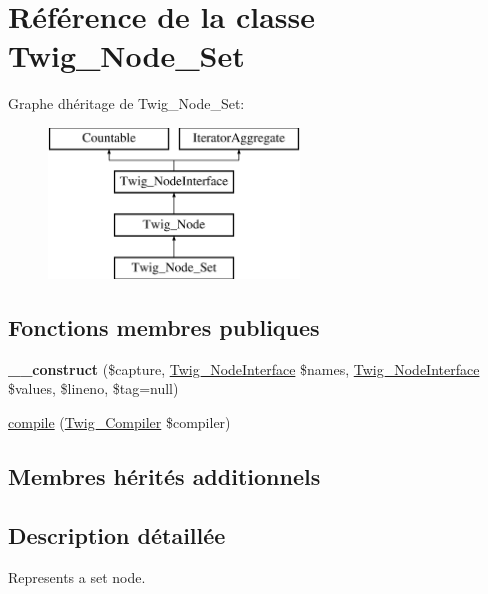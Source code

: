 \hypertarget{class_twig___node___set}{}\section{Référence de la classe Twig\+\_\+\+Node\+\_\+\+Set}
\label{class_twig___node___set}
Graphe d\textquotesingle{}héritage de Twig\+\_\+\+Node\+\_\+\+Set\+:\begin{figure}[H]
\begin{center}
\leavevmode
\includegraphics[height=4.000000cm]{class_twig___node___set}
\end{center}
\end{figure}
\subsection*{Fonctions membres publiques}
\begin{DoxyCompactItemize}
\item 
{\bfseries \+\_\+\+\_\+construct} (\$capture, \hyperlink{interface_twig___node_interface}{Twig\+\_\+\+Node\+Interface} \$names, \hyperlink{interface_twig___node_interface}{Twig\+\_\+\+Node\+Interface} \$values, \$lineno, \$tag=null)\hypertarget{class_twig___node___set_ad851d347886be52ca99a7d40f7043811}{}\label{class_twig___node___set_ad851d347886be52ca99a7d40f7043811}

\item 
\hyperlink{class_twig___node___set_a4e0faa87c3fae583620b84d3607085da}{compile} (\hyperlink{class_twig___compiler}{Twig\+\_\+\+Compiler} \$compiler)
\end{DoxyCompactItemize}
\subsection*{Membres hérités additionnels}


\subsection{Description détaillée}
Represents a set node.

